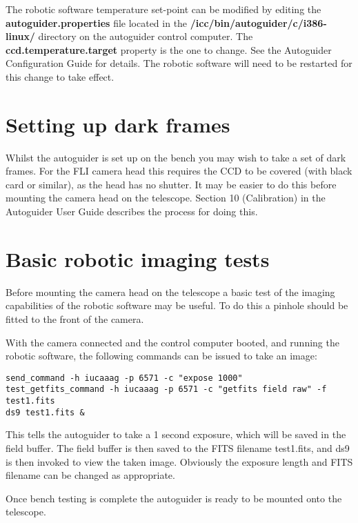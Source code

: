 \documentclass[10pt,a4paper]{article}
\begin{document}
The robotic software temperature set-point can be modified by editing the {\bf autoguider.properties} file located in the {\bf /icc/bin/autoguider/c/i386-linux/} directory on the autoguider control computer. The {\bf ccd.temperature.target } property is the one to change. See the Autoguider Configuration Guide \cite{bib:autoguiderconfigurationguide} for details. The robotic software will need to be restarted for this change to take effect.

\section{Setting up dark frames}

Whilst the autoguider is set up on the bench you may wish to take a set of dark frames. For the FLI camera head this requires the CCD to be covered (with black card or similar), as the head has no shutter. It may be easier to do this before mounting the camera head on the telescope. Section 10 (Calibration) in the Autoguider User Guide \cite{bib:autoguideruserguide} describes the process for doing this.

\section{Basic robotic imaging tests}
\label{sec:basicroboticimaging}

Before mounting the camera head on the telescope a basic test of the imaging capabilities of the robotic software may be useful. To do this a pinhole should be fitted to the front of the camera.

With the camera connected and the control computer booted, and running the robotic software, the following commands can be issued to take an image:

\begin{verbatim}
send_command -h iucaaag -p 6571 -c "expose 1000"
test_getfits_command -h iucaaag -p 6571 -c "getfits field raw" -f test1.fits
ds9 test1.fits &
\end{verbatim}

This tells the autoguider to take a 1 second exposure, which will be saved in the field buffer. The field buffer is then saved to the FITS filename test1.fits, and ds9 is then invoked to view the taken image. Obviously the exposure length and FITS filename can be changed as appropriate.

Once bench testing is complete the autoguider is ready to be mounted onto the telescope.
\end{document}
